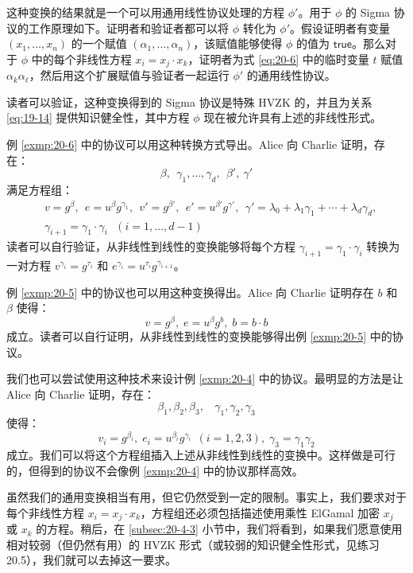 这种变换的结果就是一个可以用通用线性协议处理的方程 $\phi'$。用于 $\phi$ 的 Sigma 协议的工作原理如下。证明者和验证者都可以将 $\phi$ 转化为 $\phi'$。假设证明者有变量 $(x_1,\dots,x_n)$ 的一个赋值 $(\alpha_1,\dots,\alpha_n)$，该赋值能够使得 $\phi$ 的值为 $\mathsf{true}$。那么对于 $\phi$ 中的每个非线性方程 $x_i=x_j\cdot x_k$，证明者为式 \ref{eq:20-6} 中的临时变量 $t$ 赋值 $\alpha_k\alpha_\ell$，然后用这个扩展赋值与验证者一起运行 $\phi'$ 的通用线性协议。

读者可以验证，这种变换得到的 Sigma 协议是特殊 HVZK 的，并且为关系 \ref{eq:19-14} 提供知识健全性，其中方程 $\phi$ 现在被允许具有上述的非线性形式。

\begin{snote}[多项式计算.]
例 \ref{exmp:20-6} 中的协议可以用这种转换方式导出。Alice 向 Charlie 证明，存在：
$$
\beta,~~
\gamma_1,\dots,\gamma_d,~~
\beta',~
\gamma'
$$
满足方程组：
\begin{equation*}
\begin{aligned}
& v=g^\beta,~~
e=u^\beta g^{\gamma_1},~~
v'=g^{\beta'},~~
e'=u^{\beta'}g^{\gamma'},~~
\gamma'=\lambda_0+\lambda_1\gamma_1+\cdots+\lambda_d\gamma_d,\\
& \gamma_{i+1}=\gamma_1\cdot\gamma_i~~~(i=1,\dots,d-1)
\end{aligned}
\end{equation*}
读者可以自行验证，从非线性到线性的变换能够将每个方程 $\gamma_{i+1}=\gamma_1\cdot\gamma_i$ 转换为一对方程 $v^{\gamma_i}=g^{\tau_i}$ 和 $e^{\gamma_i}=u^{\tau_i}g^{\gamma_{i+1}}$。
\end{snote}

\begin{snote}[加密后的比特.]
例 \ref{exmp:20-5} 中的协议也可以用这种变换得出。Alice 向 Charlie 证明存在 $b$ 和 $\beta$ 使得：
$$
v=g^\beta,\;
e=u^\beta g^b,\;
b=b\cdot b
$$
成立。读者可以自行证明，从非线性到线性的变换能够得出例 \ref{exmp:20-5} 中的协议。
\end{snote}

\begin{snote}
我们也可以尝试使用这种技术来设计例 \ref{exmp:20-4} 中的协议。最明显的方法是让 Alice 向 Charlie 证明，存在：
$$
\beta_1,\beta_2,\beta_3,~~~~
\gamma_1,\gamma_2,\gamma_3
$$
使得：
$$
v_i=g^{\beta_i},\;
e_i=u^{\beta_i}g^{\gamma_i}~~(i=1,2,3),\;
\gamma_3=\gamma_1\gamma_2
$$
成立。我们可以将这个方程组插入上述从非线性到线性的变换中。这样做是可行的，但得到的协议不会像例 \ref{exmp:20-4} 中的协议那样高效。
\end{snote}

\begin{snote}[去除对非线性方程的约束.]
虽然我们的通用变换相当有用，但它仍然受到一定的限制。事实上，我们要求对于每个非线性方程 $x_i=x_j\cdot x_k$，方程组还必须包括描述使用乘性 ElGamal 加密 $x_j$ 或 $x_k$ 的方程。稍后，在 \ref{subsec:20-4-3} 小节中，我们将看到，如果我们愿意使用相对较弱（但仍然有用）的 HVZK 形式（或较弱的知识健全性形式，见练习 20.5），我们就可以去掉这一要求。
\end{snote}